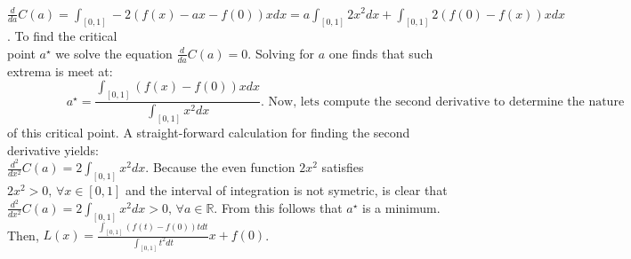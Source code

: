 \documentclass{exam}
\begin{document}
$\frac{d}{da} C(a) = \displaystyle\int_{[0,1]} -2(f(x) - ax -f(0)) x d x = a \displaystyle \int_{[0,1]} 2x^2 d x +  \displaystyle\int_{[0,1]} 2(f(0) - f(x)) x d x$.  To find the critical \\
point $a^\star$ we solve the equation $\frac{d}{da} C(a) = 0$. Solving for $a$ one finds that such extrema is meet at: 
\begin{equation*}
    \hspace{2cm}a^\star = \displaystyle\frac{\displaystyle\int_{[0,1]} (f(x) - f(0)) x d x}{\displaystyle \int_{[0,1]} x^2 d x}. \text{ Now, lets compute the second derivative to determine the nature}
\end{equation*} of this critical point. A straight-forward calculation for finding the second derivative yields: \newline
\\
$\frac{d^2}{d x^2} C(a) = 2 \displaystyle \int_{[0,1]} x^2 d x$. Because the even function $2x^2$ satisfies $2x^2 > 0 \text{, } \forall x \in [0,1]$ and the interval of integration is not symetric, is clear that $\frac{d^2}{d x^2} C(a) = 2 \displaystyle \int_{[0,1]} x^2 d x > 0 \text{, } \forall a \in \mathbb{R}$. From this follows 
that $a^\star$ is a minimum. Then, $L(x) = \displaystyle\frac{\displaystyle\int_{[0,1]} (f(t) - f(0)) t d t}{\displaystyle \int_{[0,1]} t^2 d t}x + f(0)$.
\end{document}
